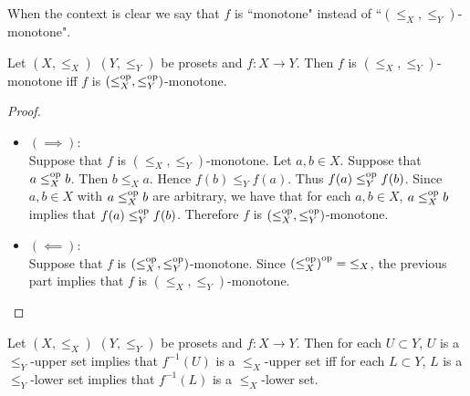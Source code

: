 \documentclass{book}
\begin{document}
	\begin{note}
		When the context is clear we say that $f$ is ``monotone" instead of ``$(\leq_X, \leq_Y)$-monotone".
	\end{note}
	
	\begin{ex} 
		Let $(X, \leq_X)$ $(Y, \leq_Y)$ be prosets and $f:X \rightarrow Y$. Then $f$ is $(\leq_X, \leq_Y)$-monotone iff $f$ is $(\leq^{\text{op}}_X, \leq^{\text{op}}_Y)$-monotone.
	\end{ex}
	
	\begin{proof}\
		\begin{itemize}
			\item $(\implies)$: \\
			Suppose that $f$ is $(\leq_X, \leq_Y)$-monotone. Let $a,b \in X$. Suppose that $a \leq^{\text{op}}_X b$. Then $b \leq_X a$. Hence $f(b) \leq_Y f(a)$. Thus $f(a) \leq^{\text{op}}_Y f(b)$. Since $a,b \in X$ with $a \leq^{\text{op}}_X b$ are arbitrary, we have that for each $a,b \in X$, $a \leq^{\text{op}}_X b$ implies that $f(a) \leq^{\text{op}}_Y f(b)$. Therefore $f$ is $(\leq^{\text{op}}_X, \leq^{\text{op}}_Y)$-monotone.
			\item $(\impliedby)$: \\
			Suppose that $f$ is $(\leq^{\text{op}}_X, \leq^{\text{op}}_Y)$-monotone. Since ${(\leq^{\text{op}}_X)}^{\text{op}} = {\leq_X}$, the previous part implies that $f$ is $(\leq_X, \leq_Y)$-monotone.
		\end{itemize}
	\end{proof}
	
	\begin{ex} 
		Let $(X, \leq_X)$ $(Y, \leq_Y)$ be prosets and $f:X \rightarrow Y$. Then for each $U \subset Y$, $U$ is a $\leq_Y$-upper set implies that $f^{-1}(U)$ is a $\leq_X$-upper set iff for each $L \subset Y$, $L$ is a $\leq_Y$-lower set implies that $f^{-1}(L)$ is a $\leq_X$-lower set.
	\end{ex}
	
\end{document}
